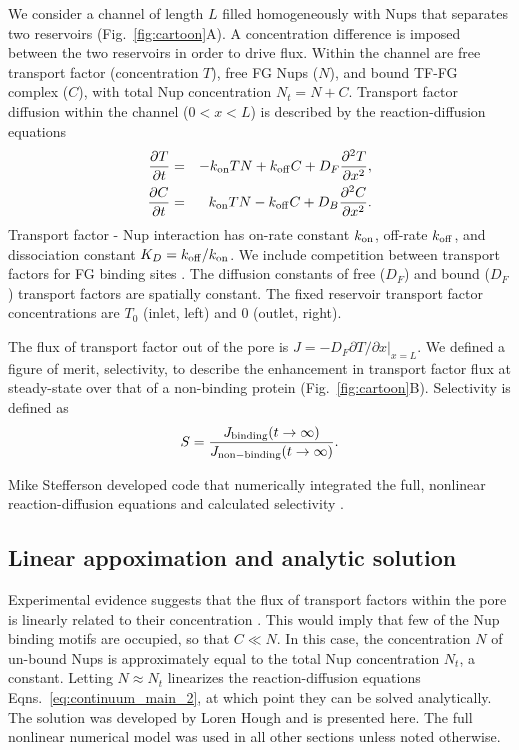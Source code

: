 We consider a channel of length $L$ filled homogeneously with Nups
that separates two reservoirs (Fig.~\ref{fig:cartoon}A).  A concentration difference is imposed between the two reservoirs in order to drive flux.  Within the channel are free transport factor (concentration $T$), free FG Nups ($N$), and bound TF-FG complex ($C$), with total Nup concentration $N_t= N+C$.  Transport factor diffusion within the channel ($0<x<L$) is described by the reaction-diffusion equations
\begin{eqnarray}
  \frac{\partial T}{\partial t} &=& -k_{\rm on} T N+k_{\rm off} C +D_F
       \frac{\partial^2 T}{\partial x^2},\label{eq:continuum_main} 
   \\ 
  \frac{\partial C}{\partial t} &=& k_{\rm on} T N -k_{\rm off} C + 
        D_B \frac{\partial^2 C}{\partial x^2} .
\label{eq:continuum_main_2} 
\end{eqnarray}
Transport factor - Nup interaction has on-rate constant $k_{\rm on}$, off-rate $k_{\rm off}$, and
dissociation constant $K_D =k_{\rm off}/k_{\rm on}$.  We include competition
between transport factors for FG binding sites \cite{timney16}.  The
diffusion constants of free ($D_F$) and bound ($D_F$) transport factors are
spatially constant. The fixed reservoir transport factor concentrations are $T_0$
(inlet, left) and 0 (outlet, right).

The flux of transport factor out of the pore is
$J = - D_F \left. \partial T/\partial x \right|_{x=L}$.
We defined a figure of merit, selectivity, to describe the enhancement in transport factor flux at steady-state over that of a non-binding protein (Fig.~\ref{fig:cartoon}B).  Selectivity is defined as
\begin{equation}
  S =  \frac{J_{\rm binding}(t \to \infty)}{J_{\rm non-binding}(t \to \infty)} .
\end{equation}

Mike Stefferson developed code that numerically integrated the full, nonlinear reaction-diffusion equations and calculated selectivity \cite{stefferson18}.

\subsection{Linear appoximation and analytic solution}
\label{sec:linear}
Experimental evidence suggests that the flux of transport factors within the pore is linearly related to their concentration \cite{timney06, schmidt15}.  This would imply that few of the Nup binding motifs are occupied, so that $C \ll N$.  In this case, the concentration $N$ of un-bound Nups is approximately equal to the total Nup concentration $N_t$, a constant.  Letting $N \approx N_t$ linearizes the reaction-diffusion equations Eqns.~\ref{eq:continuum_main_2}, at which point they can be solved analytically.  The solution was developed by Loren Hough and is presented here.  The full nonlinear numerical model was used in all other sections unless noted otherwise.

